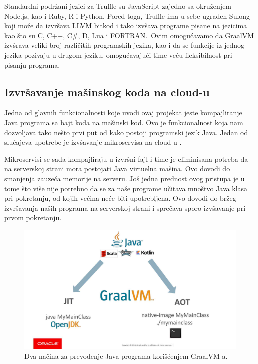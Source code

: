\documentclass[a4paper]{article}
\begin{document}
Standardni podržani jezici za Truffle su JavaScript zajedno sa okruženjem Node.js, kao i Ruby, R i Python. Pored toga, Truffle ima u sebe ugrađen Sulong koji može da izvršava LLVM bitkod i tako izvšava programe pisane na jezicima kao što su C, C++, C\#, D, Lua i FORTRAN.\ Ovim omogućavamo da GraalVM izvšrava veliki broj različitih programskih jezika, kao i da se funkcije iz jednog jezika pozivaju u drugom jeziku, omogućavajući time veću fleksibilnost pri pisanju programa.

\subsection{Izvršavanje mašinskog koda na cloud-u}
\label{sub:cloud}

Jedna od glavnih funkcionalnosti koje uvodi ovaj projekat jeste kompajliranje Java programa sa bajt koda na mašinski kod. Ovo je funkcionalnost koja nam dozvoljava tako nešto prvi put od kako postoji programski jezik Java. Jedan od slučajeva upotrebe je izvšavanje mikroservisa na cloud-u \cite{sipek21}.

Mikroservisi se sada kompajliraju u izvršni fajl i time je eliminisana potreba da na serverskoj strani mora postojati Java virtuelna mašina. Ovo dovodi do smanjenja zauzeća memorije na serveru. Još jedna prednost ovog pristupa je u tome što više nije potrebno da se za naše programe učitava mnoštvo Java klasa pri pokretanju, od kojih većina neće biti upotrebljena. Ovo dovodi do bržeg izvršavanja naših programa na serverskoj strani i sprečava sporo izvšavanje pri prvom pokretanju. 

\begin{figure}
	\begin{center}
	\includegraphics[scale=0.25]{imgs/run_java.jpg}
	\end{center}
	\caption{Dva načina za prevođenje Java programa korišćenjem GraalVM-a.}
	\label{fig:runjava}
\end{figure}
\end{document}
